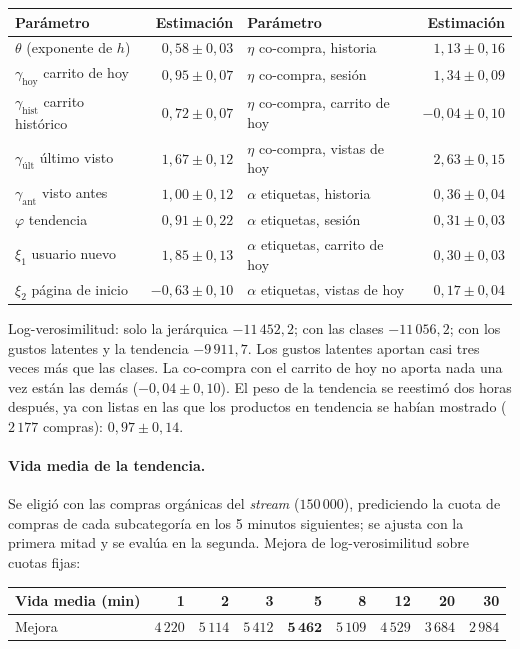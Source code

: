 \documentclass[11pt,a4paper]{article}
\begin{document}
\begin{center}
\small
\begin{tabular}{lrlr}
\toprule
Parámetro & Estimación & Parámetro & Estimación\\
\midrule
$\theta$ (exponente de $h$) & $0{,}58\pm0{,}03$ & $\eta$ co-compra, historia & $1{,}13\pm0{,}16$\\
$\gamma_{\text{hoy}}$ carrito de hoy & $0{,}95\pm0{,}07$ & $\eta$ co-compra, sesión & $1{,}34\pm0{,}09$\\
$\gamma_{\text{hist}}$ carrito histórico & $0{,}72\pm0{,}07$ & $\eta$ co-compra, carrito de hoy & $-0{,}04\pm0{,}10$\\
$\gamma_{\text{últ}}$ último visto & $1{,}67\pm0{,}12$ & $\eta$ co-compra, vistas de hoy & $2{,}63\pm0{,}15$\\
$\gamma_{\text{ant}}$ visto antes & $1{,}00\pm0{,}12$ & $\alpha$ etiquetas, historia & $0{,}36\pm0{,}04$\\
$\varphi$ tendencia & $0{,}91\pm0{,}22$ & $\alpha$ etiquetas, sesión & $0{,}31\pm0{,}03$\\
$\xi_1$ usuario nuevo & $1{,}85\pm0{,}13$ & $\alpha$ etiquetas, carrito de hoy & $0{,}30\pm0{,}03$\\
$\xi_2$ página de inicio & $-0{,}63\pm0{,}10$ & $\alpha$ etiquetas, vistas de hoy & $0{,}17\pm0{,}04$\\
\bottomrule
\end{tabular}
\end{center}

Log-verosimilitud: solo la jerárquica $-11\,452{,}2$; con las clases $-11\,056{,}2$; con los gustos latentes
y la tendencia $-9\,911{,}7$. Los gustos latentes aportan casi tres veces más que las clases. La
co-compra con el carrito de hoy no aporta nada una vez están las demás ($-0{,}04\pm0{,}10$). El peso de la
tendencia se reestimó dos horas después, ya con listas en las que los productos en tendencia se habían
mostrado ($2\,177$ compras): $0{,}97\pm0{,}14$.

\paragraph{Vida media de la tendencia.} Se eligió con las compras orgánicas del \emph{stream}
($150\,000$), prediciendo la cuota de compras de cada subcategoría en los 5 minutos siguientes; se
ajusta con la primera mitad y se evalúa en la segunda. Mejora de log-verosimilitud sobre cuotas fijas:

\begin{center}
\small
\begin{tabular}{lrrrrrrrr}
\toprule
Vida media (min) & 1 & 2 & 3 & 5 & 8 & 12 & 20 & 30\\
\midrule
Mejora & $4\,220$ & $5\,114$ & $5\,412$ & $\mathbf{5\,462}$ & $5\,109$ & $4\,529$ & $3\,684$ & $2\,984$\\
\bottomrule
\end{tabular}
\end{center}
\end{document}
